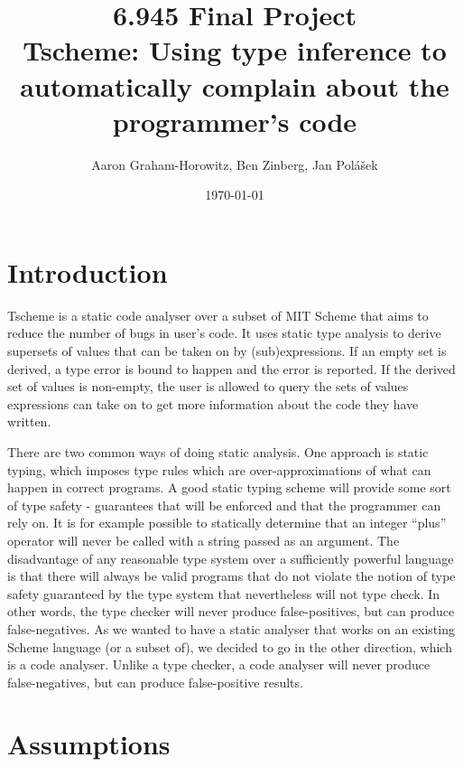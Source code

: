 \documentclass[a4paper]{article}
\begin{document}
\title{6.945 Final Project\\
Tscheme: Using type inference to automatically complain about the programmer's code}
\date{\today}
\author{Aaron Graham-Horowitz, Ben Zinberg, Jan Polášek}
\maketitle

\newpage

\section{Introduction}

Tscheme is a static code analyser over a subset of MIT Scheme
that aims to reduce the number of bugs in user's code.
It uses static type analysis to derive supersets of values that can be taken on by
(sub)expressions.
If an empty set is derived, a type error is bound to happen and the error is reported.
If the derived set of values is non-empty, the user is allowed to query the sets of
values expressions can take on to get more information about the code they have written.

There are two common ways of doing static analysis.
One approach is static typing, which imposes type rules which are
over-approximations of what can happen in correct programs.
A good static typing scheme will provide some sort of type safety -
guarantees that will be enforced and that the programmer can rely on.
It is for example possible to statically determine that an integer ``plus''
operator will never be called with a string passed as an argument.
The disadvantage of any reasonable type system over a sufficiently powerful language
is that there will always be valid programs that do not violate the notion of
type safety guaranteed by the type system that nevertheless will not type check.
In other words, the type checker will never produce false-positives,
but can produce false-negatives.
As we wanted to have a static analyser that works on an existing Scheme
language (or a subset of), we decided to go in the other direction,
which is a code analyser.
Unlike a type checker, a code analyser will never produce false-negatives,
but can produce false-positive results.

\section{Assumptions}

\end{document}
